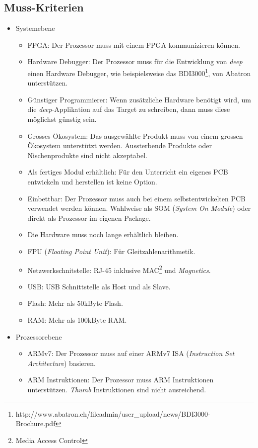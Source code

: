 \subsection{Muss-Kriterien}
\begin{itemize}
\item Systemebene
	\begin{itemize}
	\item FPGA: Der Prozessor muss mit einem FPGA kommunizieren können.
	\item Hardware Debugger: Der Prozessor muss für die Entwicklung von \textit{deep} einen Hardware Debugger, wie beispielsweise das BDI3000\footnote{http://www.abatron.ch/fileadmin/user\_upload/news/BDI3000-Brochure.pdf}, von Abatron unterstützen. 
	\item Günstiger Programmierer: Wenn zusätzliche Hardware benötigt wird, um die \textit{deep}-Applikation auf das Target zu schreiben, dann muss diese möglichst günstig sein.
	\item Grosses Ökosystem: Das ausgewählte Produkt muss von einem grossen Ökosystem unterstützt werden. Aussterbende Produkte oder Nischenprodukte sind nicht akzeptabel.
	\item Als fertiges Modul erhältlich: Für den Unterricht ein eigenes PCB entwickeln und herstellen ist keine Option.
	\item Einbettbar: Der Prozessor muss auch bei einem selbstentwickelten PCB verwendet werden können. Wahlweise als SOM (\textit{System On Module}) oder direkt als Prozessor im eigenen Package.
	\item Die Hardware muss noch lange erhältlich bleiben.
	\item FPU (\textit{Floating Point Unit}): Für Gleitzahlenarithmetik.
	\item Netzwerkschnitstelle: RJ-45 inklusive MAC\footnote{Media Access Control} und \textit{Magnetics}.
	\item USB: USB Schnittstelle als Host und als Slave.
	\item Flash: Mehr als 50kByte Flash.
	\item RAM: Mehr als 100kByte RAM.
	\end{itemize}
\item Prozessorebene
	\begin{itemize}
	\item ARMv7: Der Prozessor muss auf einer ARMv7 ISA (\textit{Instruction Set Architecture}) basieren.
	\item ARM Instruktionen: Der Prozessor muss ARM Instruktionen unterstützen. \textit{Thumb} Instruktionen sind nicht ausreichend.
	\end{itemize}
\end{itemize}


